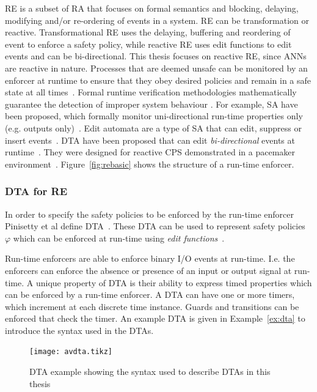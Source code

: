 \acf{RE} is a subset of \ac{RA} that focuses on formal semantics and blocking, delaying, modifying and/or re-ordering of events in a system. 
\ac{RE} can be transformation or reactive.
Transformational \ac{RE} uses the delaying, buffering and reordering of event to enforce a safety policy, while reactive \ac{RE} uses edit functions to edit events and can be bi-directional.
This thesis focuses on reactive \ac{RE}, since \acp{ANN} are reactive in nature.
Processes that are deemed unsafe can be monitored by an enforcer at runtime to ensure that they obey desired policies and remain in a safe state at all times~\cite{theoryRE}. 
Formal runtime verification methodologies mathematically guarantee the detection of improper system behaviour \cite{RuntimeAssuranceForComplexCPS}.
For example, \ac{SA} have been proposed, which formally monitor uni-directional run-time properties only (e.g. outputs only)~\cite{enfsafepol}.
Edit automata are a type of \ac{SA} that can edit, suppress or insert events~\cite{editautomata}. 
\ac{DTA} have been proposed that can edit \textit{bi-directional} events at runtime~\cite{recps}. 
They were designed for reactive \ac{CPS} demonstrated in a pacemaker environment~\cite{recps}. 
Figure~\ref{fig:rebasic} shows the structure of a run-time enforcer.

\subsubsection{\acf{DTA} for \acf{RE}}
In order to specify the safety policies to be enforced by the run-time enforcer Pinisetty et al define \acf{DTA}~\cite{recps}.
These \ac{DTA} can be used to represent safety policies $\varphi$ which can be enforced at run-time using \textit{edit functions}~\cite{recps}.

Run-time enforcers are able to enforce binary I/O events at run-time.
I.e. the enforcers can enforce the absence or presence of an input or output signal at run-time.
A unique property of \ac{DTA} is their ability to express timed properties which can be enforced by a run-time enforcer.
A \ac{DTA} can have one or more timers, which increment at each discrete time instance.
Guards and transitions can be enforced that check the timer.
An example \ac{DTA} is given in Example~\ref{ex:dta} to introduce the syntax used in the \acp{DTA}.

\begin{figure}[h]
	\centering
	\texttt{[image: avdta.tikz]}
	\caption{\ac{DTA} example showing the syntax used to describe \acp{DTA} in this thesis\label{fig:avdta}}
\end{figure}

